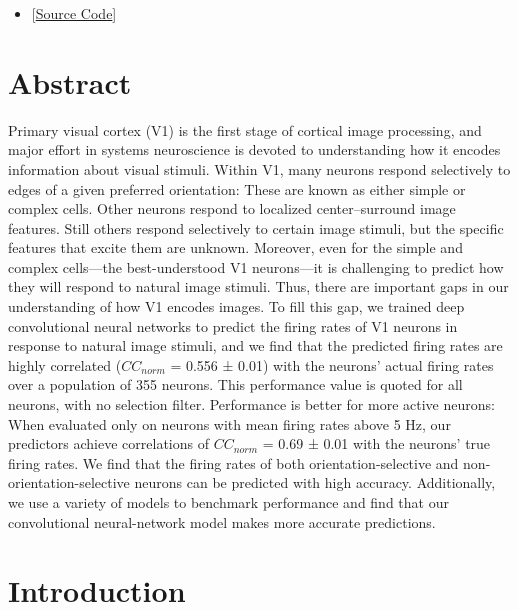 \documentclass{templates/ucdenverthesis}
\begin{document}
\begin{itemize}
\tightlist
\item
  {[}\href{https://github.com/jzlab/v1_predictor}{Source Code}{]}
\end{itemize}

\hypertarget{abstract-2}{%
\section*{Abstract}\label{abstract-2}}

Primary visual cortex (V1) is the first stage of cortical image processing, and major effort in systems neuroscience is devoted to understanding how it encodes information about visual stimuli. Within V1, many neurons respond selectively to edges of a given preferred orientation: These are known as either simple or complex cells. Other neurons respond to localized center--surround image features. Still others respond selectively to certain image stimuli, but the specific features that excite them are unknown. Moreover, even for the simple and complex cells---the best-understood V1 neurons---it is challenging to predict how they will respond to natural image stimuli. Thus, there are important gaps in our understanding of how V1 encodes images. To fill this gap, we trained deep convolutional neural networks to predict the firing rates of V1 neurons in response to natural image stimuli, and we find that the predicted firing rates are highly correlated (\(CC_{norm}\) = 0.556 ± 0.01) with the neurons' actual firing rates over a population of 355 neurons. This performance value is quoted for all neurons, with no selection filter. Performance is better for more active neurons: When evaluated only on neurons with mean firing rates above 5 Hz, our predictors achieve correlations of \(CC_{norm}\) = 0.69 ± 0.01 with the neurons' true firing rates. We find that the firing rates of both orientation-selective and non-orientation-selective neurons can be predicted with high accuracy. Additionally, we use a variety of models to benchmark performance and find that our convolutional neural-network model makes more accurate predictions.

\hypertarget{introduction}{%
\section{Introduction}\label{introduction}}
\end{document}
